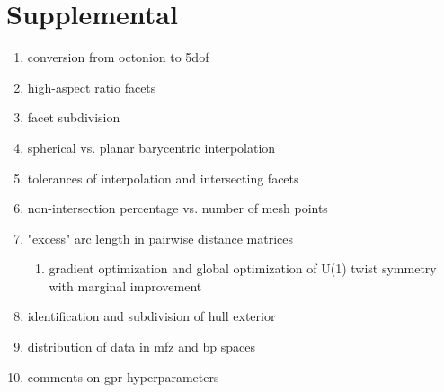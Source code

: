 \documentclass[preprint,12pt]{elsarticle}
\begin{document}
\section{Supplemental}
\begin{enumerate}
    \item conversion from octonion to \gls{5dof}
    \item high-aspect ratio facets
    \item facet subdivision
    \item spherical vs. planar barycentric interpolation
    \item tolerances of interpolation and intersecting facets
    \item non-intersection percentage vs. number of mesh points
    \item "excess" arc length in pairwise distance matrices
    \begin{enumerate}
        \item gradient optimization and global optimization of U(1) twist symmetry with marginal improvement
    \end{enumerate}
    \item identification and subdivision of hull exterior
    \item distribution of data in \gls{mfz} and \gls{bp} spaces
    \item comments on \gls{gpr} hyperparameters
\end{enumerate}

\newpage
\printglossaries

\newpage


\end{document}
